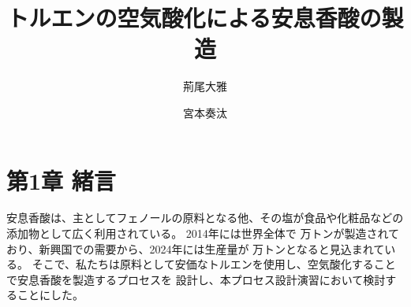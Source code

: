 \documentclass[platex, a4j]{jsarticle}
\begin{document}
\title{トルエンの空気酸化による安息香酸の製造}
\author{荊尾大雅 \and 宮本奏汰}
\maketitle

\newpage

\section*{第1章 緒言}
安息香酸は、主としてフェノールの原料となる他、その塩が食品や化粧品などの添加物として広く利用されている。
2014年には世界全体で 万トンが製造されており、新興国での需要から、2024年には生産量が 万トンとなると見込まれている。
そこで、私たちは原料として安価なトルエンを使用し、空気酸化することで安息香酸を製造するプロセスを
設計し、本プロセス設計演習において検討することにした。

\newpage
\end{document}
